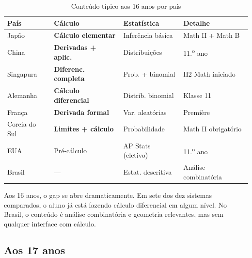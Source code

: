 \documentclass[12pt,a4paper,oneside]{article}
\begin{document}
\begin{table}[H]
\centering
\caption{Conteúdo típico aos 16 anos por país}
\label{tab:idade-16}
\small
\begin{tabular}{@{}lp{3cm}p{2.5cm}p{5.5cm}@{}}
\toprule
\textbf{País} & \textbf{Cálculo} & \textbf{Estatística} & \textbf{Detalhe} \\
\midrule
Japão          & \textbf{Cálculo elementar} & Inferência básica & Math II + Math B \\
China          & \textbf{Derivadas + aplic.}& Distribuições     & 11.\textsuperscript{o} ano \\
Singapura      & \textbf{Diferenc. completa}& Prob. + binomial  & H2 Math iniciado \\
Alemanha       & \textbf{Cálculo diferencial}& Distrib. binomial& Klasse 11 \\
França         & \textbf{Derivada formal}   & Var. aleatórias    & Première \\
Coreia do Sul  & \textbf{Limites + cálculo} & Probabilidade      & Math II obrigatório \\
EUA            & Pré-cálculo                & AP Stats (eletivo) & 11.\textsuperscript{o} ano \\
Brasil         & ---                        & Estat. descritiva  & Análise combinatória \\
\bottomrule
\end{tabular}
\end{table}

Aos 16 anos, o gap se abre dramaticamente. Em sete dos dez sistemas
comparados, o aluno já está fazendo cálculo diferencial em algum
nível. No Brasil, o conteúdo é análise combinatória e geometria
\textemdash{} relevantes, mas sem qualquer interface com cálculo.

\subsection{Aos 17 anos}
\end{document}
